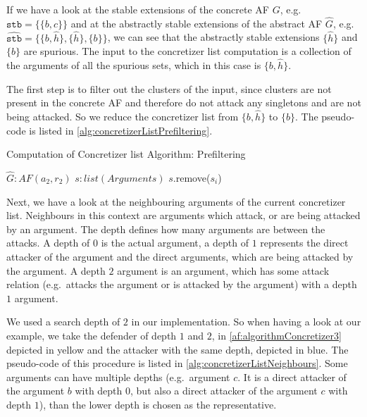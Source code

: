 If we have a look at the stable extensions of the concrete AF $G$, e.g.\ 
$\mathtt{stb=}\bigl\{\{b, c\}\bigl\}$ and at the abstractly stable extensions of the abstract AF $\hat{G}$, e.g.\ 
$\mathtt{\hat{stb}=}\bigl\{\{b, \hat{h}\}, \{\hat{h}\}, \{b\}\bigl\}$, we can see that the abstractly stable extensions $\{\hat{h}\}$ and $\{b\}$ are spurious. The input to the concretizer list computation is a collection of the arguments of all the spurious sets, which in this case is $\{b, \hat{h}\}$.

The first step is to filter out the clusters of the input, since clusters are not present in the concrete AF and therefore do not attack any singletons and are not being attacked. So we reduce the concretizer list from $\{b, \hat{h}\}$ to $\{b\}$. The pseudo-code is listed in \cref{alg:concretizerListPrefiltering}.

\begin{algorithm}[H]
    \caption{Computation of Concretizer list Algorithm: Prefiltering}\label{alg:concretizerListPrefiltering}
    \begin{algorithmic}[1]
        \Require $\hat{G}: AF(a_2, r_2)$ \Comment{Abstract AF}
        \Require $s: list(Arguments)$ 
        \For{$s_i$ in $s$}
            \If{$s_i$ in $\hat{G}$ is cluster}
                \State $s$.remove($s_i$)
            \EndIf
        \EndFor
    \end{algorithmic}
\end{algorithm}

Next, we have a look at the neighbouring arguments of the current concretizer list.  Neighbours in this context are arguments which attack, or are being attacked by an argument. The depth defines how many arguments are between the attacks. A depth of $0$ is the actual argument, a depth of $1$ represents the direct attacker of the argument and the direct arguments, which are being attacked by the argument. A depth $2$ argument is an argument, which has some attack relation (e.g.\ attacks the argument or is attacked by the argument) with a depth $1$ argument.

We used a search depth of $2$ in our implementation. So when having a look at our example, we take the defender of depth $1$ and $2$, in \cref{af:algorithmConcretizer3} depicted in yellow and the attacker with the same depth, depicted in blue. The pseudo-code of this procedure is listed in \cref{alg:concretizerListNeighbours}. Some arguments can have multiple depths (e.g.\ argument $c$. It is a direct attacker of the argument $b$ with depth $0$, but also a direct attacker of the argument $c$ with depth $1$), than the lower depth is chosen as the representative.

